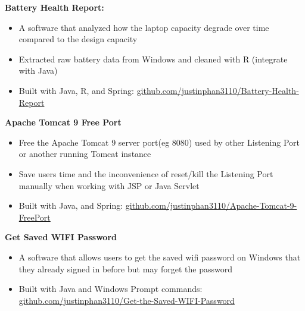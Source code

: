 \documentclass[a4paper,11pt]{article}
\begin{document}
\begin{flushleft}
	
 \textbf{Battery Health Report:} 
 \vspace{-\topsep}
 \begin{itemize}
 	\setlength{\parskip}{0pt}
 	\setlength{\itemsep}{0pt plus 1pt}
 	\item A software that analyzed how the laptop capacity degrade over time compared to the design capacity 
 	\item Extracted raw battery data from Windows and cleaned with R (integrate with Java)
 	\item Built with Java, R, and Spring: \href{https://github.com/justinphan3110/Battery-Health-Report}{github.com/justinphan3110/Battery-Health-Report}
 \end{itemize}

  \textbf{Apache Tomcat 9 Free Port} 
  \vspace{-\topsep}
  \begin{itemize}
  	\setlength{\parskip}{0pt}
  	\setlength{\itemsep}{0pt plus 1pt}
  	\item Free the Apache Tomcat 9 server port(eg 8080) used by other Listening Port or another running Tomcat instance
  	\item Save users time and the inconvenience of reset/kill the Listening Port manually when working with JSP or Java Servlet
  	\item Built with Java, and Spring: \href{https://github.com/justinphan3110/Apache-Tomcat-9-Free-Port}{github.com/justinphan3110/Apache-Tomcat-9-FreePort}
  \end{itemize}

  \textbf{Get Saved WIFI Password}
  \vspace{-\topsep}
  \begin{itemize}
  	\setlength{\parskip}{0pt}
  	\setlength{\itemsep}{0pt plus 1pt}
  	\item A software that allows users to get the saved wifi password on Windows that they already signed in before but may forget the password
  	\item Built with Java and Windows Prompt commands: \href{https://github.com/justinphan3110/Get-the-Saved-WIFI-Password}{github.com/justinphan3110/Get-the-Saved-WIFI-Password}
  \end{itemize}
\end{flushleft}
\end{document}
